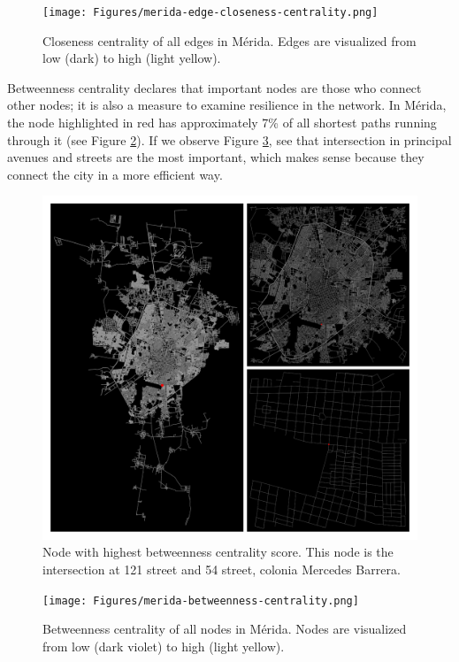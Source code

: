 \begin{figure}[htpb]
  \centering
  \texttt{[image: Figures/merida-edge-closeness-centrality.png]}
  \caption{Closeness centrality of all edges in Mérida. Edges are visualized from low (dark) to high (light yellow).
    \label{fig:merida-edge-closeness-centrality}}
\end{figure}

Betweenness centrality declares that important nodes are those who connect other nodes; it is also a measure to examine resilience in the network. In Mérida, the node highlighted in red has approximately 7\% of all shortest paths running through it (see Figure \ref{fig:merida-max-node-betweenness-centrality}). If we observe Figure \ref{fig:merida-betweenness-centrality}, see that intersection in principal avenues and streets are the most important, which makes sense because they connect the city in a more efficient way.

\begin{figure}[htpb]
  \centering
  \includegraphics[width=1.0\textwidth]{Figures/merida-node-betweenness-centrality.png}
  \caption{Node with highest betweenness centrality score. This node is the intersection at 121 street and 54 street, colonia Mercedes Barrera.
    \label{fig:merida-max-node-betweenness-centrality}}
\end{figure}

\begin{figure}[htpb]
  \centering
  \texttt{[image: Figures/merida-betweenness-centrality.png]}
  \caption{Betweenness centrality of all nodes in Mérida. Nodes are visualized from low (dark violet) to high (light yellow).
    \label{fig:merida-betweenness-centrality}}
\end{figure}

